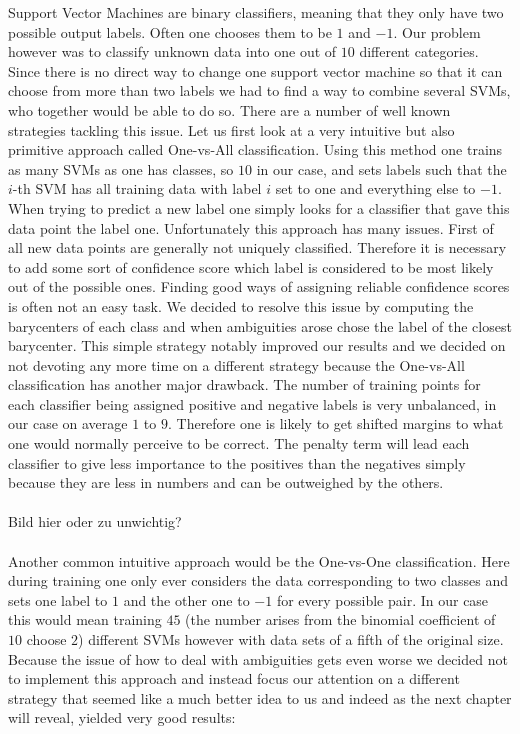 Support Vector Machines are binary classifiers, meaning that they only have two possible output labels. Often one chooses them to be $1$ and $-1$. Our problem however was to classify unknown data into one out of $10$ different categories. Since there is no direct way to change one support vector machine so that it can choose from more than two labels we had to find a way to combine several SVMs, who together would be able to do so. There are a number of well known strategies tackling this issue. Let us first look at a very intuitive but also primitive approach called One-vs-All classification. Using this method one trains as many SVMs as one has classes, so $10$ in our case, and sets labels such that the $i$-th SVM has all training data with label $i$ set to one and everything else to $-1$. When trying to predict a new label one simply looks for a classifier that gave this data point the label one. Unfortunately this approach has many issues. First of all new data points are generally not uniquely classified. Therefore it is necessary to add some sort of confidence score which label is considered to be most likely out of the possible ones. Finding good ways of assigning reliable confidence scores is often not an easy task. We decided to resolve this issue by computing the barycenters of each class and when ambiguities arose chose the label of the closest barycenter. This simple strategy notably improved our results and we decided on not devoting any more time on a different strategy because the One-vs-All classification has another major drawback. The number of training points for each classifier being assigned positive and negative labels is very unbalanced, in our case on average $1$ to $9$. Therefore one is likely to get shifted margins to what one would normally perceive to be correct. The penalty term will lead each classifier to give less importance to the positives than the negatives simply because they are less in numbers and can be outweighed by the others. \\ \\ Bild hier oder zu unwichtig? \\  \\ Another common intuitive approach would be the One-vs-One classification. Here during training one only ever considers the data corresponding to two classes and sets one label to $1$ and the other one to $-1$ for every possible pair. 
In our case this would mean training $45$ (the number arises from the binomial coefficient of $10$ choose $2$) different SVMs however with data sets of a fifth of the original size. Because the issue of how to deal with ambiguities gets even worse we decided not to implement this approach and instead focus our attention on a different strategy that seemed like a much better idea to us and indeed as the next chapter will reveal, yielded very good results:

